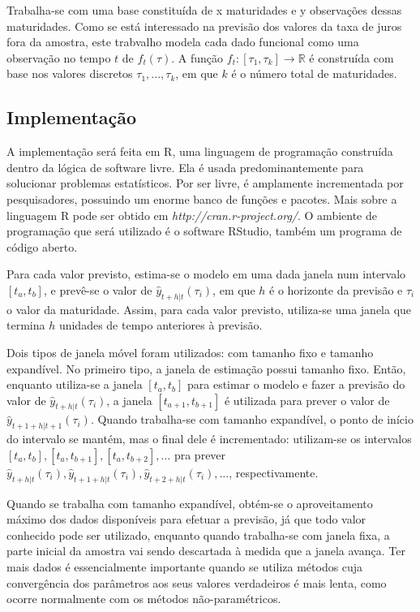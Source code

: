 \documentclass[
	12pt,				%
	openright,			%
	oneside,			%
	a4paper,			%
	english,			%
	brazil				%
	]{dissertacao-ufrgs-abntex2}
\begin{document}
Trabalha-se com uma base constituída de x  maturidades e y observações dessas maturidades. Como se está interessado na previsão dos valores da taxa de juros fora da amostra, este trabvalho modela cada dado funcional como uma observação no tempo $t$ de $f_t(\tau)$. A função $f_t:[\tau_1,\tau_k] \rightarrow \mathbb{R}$ é construída com base nos valores discretos ${\tau_1, ..., \tau_k}$, em que $k$ é o número total de maturidades.



\subsection*{Implementação}

A implementação será feita em R, uma linguagem de programação construída dentro da lógica de software livre. Ela é usada predominantemente para solucionar problemas estatísticos. Por ser livre, é amplamente incrementada por pesquisadores, possuindo um enorme banco de funções e pacotes. Mais sobre a linguagem R pode ser obtido em \emph{http://cran.r-project.org/}. O ambiente de programação que será utilizado é o software RStudio, também um programa de código aberto.

Para cada valor previsto, estima-se o modelo em uma dada janela num intervalo $[t_a,t_b]$, e prevê-se o valor de  $\hat{y}_{t+h|t}(\tau_i)$, em que $h$ é o horizonte da previsão e $\tau_i$ o valor da maturidade. Assim, para cada valor previsto, utiliza-se uma janela que termina $h$ unidades de tempo anteriores à previsão.

Dois tipos de janela móvel foram utilizados: com tamanho fixo e tamanho expandível. 
No primeiro tipo, a janela de estimação possui tamanho fixo. Então, enquanto utiliza-se a janela $[t_a,t_b]$ para estimar o modelo e fazer a previsão do valor de $\hat{y}_{t+h|t}(\tau_i)$, a janela $[t_{a+1},t_{b+1}]$ é utilizada para prever o valor de $\hat{y}_{t+1+h|t+1}(\tau_i)$. Quando trabalha-se com tamanho expandível, o ponto de início do intervalo se mantém, mas o final dele é incrementado: utilizam-se os intervalos $[t_{a},t_{b}] ,[t_{a},t_{b+1}],[t_{a},t_{b+2}],\dots$  pra prever $\hat{y}_{t+h|t}(\tau_i),\hat{y}_{t+1+h|t}(\tau_i),\hat{y}_{t+2+h|t}(\tau_i),\dots$, respectivamente.

Quando se trabalha com tamanho expandível, obtém-se o aproveitamento máximo dos dados disponíveis para efetuar a previsão, já que todo valor conhecido pode ser utilizado, enquanto quando trabalha-se com janela fixa, a parte inicial da amostra vai sendo descartada à medida que a janela avança. Ter mais dados é essencialmente importante quando se utiliza métodos cuja convergência dos parâmetros aos seus valores verdadeiros é mais lenta, como ocorre normalmente com os métodos não-paramétricos. 
\end{document}
